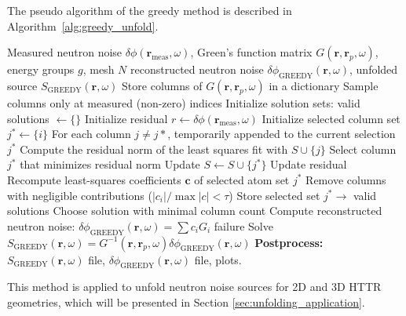 The pseudo algorithm of the greedy method  is described in Algorithm~\ref{alg:greedy_unfold}.
\begin{algorithm}[H]
\caption{: Greedy Method}
\label{alg:greedy_unfold}
\begin{algorithmic}[1]
\Require Measured neutron noise $\delta \phi(\textbf{r}_{\text{meas}}, \omega)$, Green’s function matrix $G(\textbf{r}, \textbf{r}_p,\omega)$, energy groups $g$, mesh $N$
\Ensure reconstructed neutron noise $\delta \phi_{\text{GREEDY}}(\textbf{r}, \omega)$, unfolded source $S_{\text{GREEDY}}(\textbf{r}, \omega)$
 
        \State Store columns of $G(\textbf{r}, \textbf{r}_p,\omega)$ in a dictionary
    \EndFor
\EndFor
\State Sample columns only at measured (non-zero) indices
\State Initialize solution sets: valid solutions $\gets \{\}$
 
    \State Initialize residual $r \gets \delta \phi(\textbf{r}_{\text{meas}}, \omega)$
    \State Initialize selected column set $j^* \gets \{i\}$
        \State For each column $j \neq j*$, temporarily appended to the current selection $j^*$
        \State Compute the residual norm of the least squares fit with $S \cup \{j\}$
        \State Select column $j^*$ that minimizes residual norm
        \State Update $S \gets S \cup \{j^*\}$
        \State Update residual
    \EndWhile
    \State Recompute least-squares coefficients $\mathbf{c}$ of selected atom set $j^*$
    \State Remove columns with negligible contributions ($|c_i|/\max |c| < \tau$)    
    \State Store selected set $j^* \rightarrow$ valid solutions
\EndFor
{} 
    \State Choose solution with minimal column count
    \State Compute reconstructed neutron noise: $\delta \phi_{\text{GREEDY}}(\textbf{r}, \omega) = \sum c_i G_i$
\Else
    \State \Return failure
\EndIf
\State Solve $S_{\text{GREEDY}}(\textbf{r}, \omega) = G^{-1}(\textbf{r}, \textbf{r}_p,\omega) \delta \phi_\text{GREEDY}(\textbf{r}, \omega)$
\State \textbf{Postprocess:} $S_{\text{GREEDY}}(\textbf{r}, \omega)$ file, $\delta \phi_\text{GREEDY}(\textbf{r}, \omega)$ file, plots. 
\end{algorithmic}
\end{algorithm}

This method is applied to unfold neutron noise sources for 2D and 3D HTTR geometries, which will be presented in Section \ref{sec:unfolding_application}.

